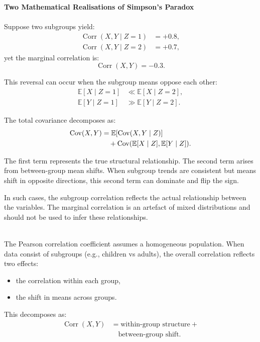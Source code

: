 \begin{technical}
{\Large\textbf{Two Mathematical Realisations of Simpson's Paradox}}\\[0.3em]
\vspace{1em}
\\[0.5em]
Suppose two subgroups yield:
\begin{align*}
\operatorname{Corr}(X, Y \mid Z=1) &= +0.8, \\
\operatorname{Corr}(X, Y \mid Z=2) &= +0.7,
\end{align*}
yet the marginal correlation is:
\[
\operatorname{Corr}(X, Y) = -0.3.
\]

This reversal can occur when the subgroup means oppose each other:
\begin{align*}
\mathbb{E}[X \mid Z=1] &\ll \mathbb{E}[X \mid Z=2], \\
\mathbb{E}[Y \mid Z=1] &\gg \mathbb{E}[Y \mid Z=2].
\end{align*}

The total covariance decomposes as:
\begin{align*}
\operatorname{Cov}(X, Y) &= \mathbb{E}[\operatorname{Cov}(X, Y \mid Z)] \notag \\
&\quad + \operatorname{Cov}(\mathbb{E}[X \mid Z], \mathbb{E}[Y \mid Z]).
\end{align*}

The first term represents the true structural relationship. The second term arises from between-group mean shifts. When subgroup trends are consistent but means shift in opposite directions, this second term can dominate and flip the sign.

In such cases, the subgroup correlation reflects the actual relationship between the variables. The marginal correlation is an artefact of mixed distributions and should not be used to infer these relationships.

\\[0.5em]
The Pearson correlation coefficient assumes a homogeneous population. When data consist of subgroups (e.g., children vs adults), the overall correlation reflects two effects:
\begin{itemize}
\item the correlation within each group,
\item the shift in means across groups.
\end{itemize}

This decomposes as:
\begin{align*}
\operatorname{Corr}(X, Y) &= 
\text{within-group structure} +\\& \quad\text{between-group shift}.
\end{align*}


\end{technical}
